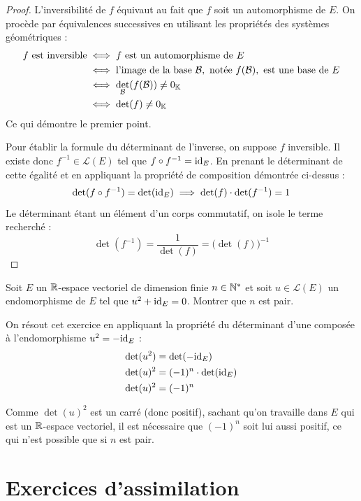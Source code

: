 \documentclass[12pt, a4paper]{report}
\begin{document}
\begin{proof}
    L'inversibilité de $f$ équivaut au fait que $f$ soit un automorphisme de $E$. On procède par équivalences successives en utilisant les propriétés des systèmes géométriques :
    \begin{align*}
        f \text{ est inversible} &\iff f \text{ est un automorphisme de } E \\
        &\iff \text{l'image de la base } \mathcal{B}, \text{ notée } f(\mathcal{B}), \text{ est une base de } E \\
        &\iff \det_{\mathcal{B}}(f(\mathcal{B})) \ne 0_{\mathbb{K}} \\
        &\iff \det(f) \ne 0_{\mathbb{K}}
    \end{align*}
    Ce qui démontre le premier point. 
    
    Pour établir la formule du déterminant de l'inverse, on suppose $f$ inversible. Il existe donc $f^{-1} \in \mathcal{L}(E)$ tel que $f \circ f^{-1} = \mathrm{id}_E$. En prenant le déterminant de cette égalité et en appliquant la propriété de composition démontrée ci-dessus :
    $$\det(f \circ f^{-1}) = \det(\mathrm{id}_E) \implies \det(f) \cdot \det(f^{-1}) = 1$$
    Le déterminant étant un élément d'un corps commutatif, on isole le terme recherché :
    $$\det(f^{-1}) = \frac{1}{\det(f)} = \bigl(\det(f)\bigr)^{-1}$$
\end{proof}

\begin{exercise}
    Soit $E$ un $\mathbb{R}$-espace vectoriel de dimension finie $n \in \mathbb{N}^*$ et soit $u \in \mathcal{L}(E)$ un endomorphisme de $E$ tel que $u^2 + \mathrm{id}_E = 0$. Montrer que $n$ est pair.
\end{exercise}

On résout cet exercice en appliquant la propriété du déterminant d'une composée à l'endomorphisme $u^2 = -\mathrm{id}_E$ :
\begin{align*}
    \det(u^2) &= \det(-\mathrm{id}_E) \\
    \det(u)^2 &= (-1)^n \cdot \det(\mathrm{id}_E) \\
    \det(u)^2 &= (-1)^n
\end{align*}

Comme $\det(u)^2$ est un carré (donc positif), sachant qu'on travaille dans $E$ qui est un $\mathbb{R}$-espace vectoriel, il est nécessaire que $(-1)^n$ soit lui aussi positif, ce qui n'est possible que si $n$ est pair.

\chapter*{Exercices d'assimilation}
\end{document}
